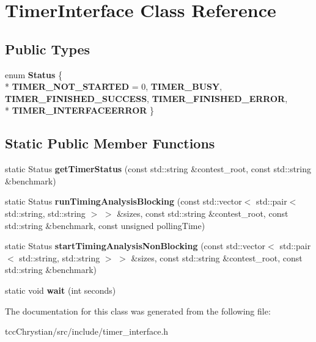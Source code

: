 \hypertarget{classTimerInterface}{\section{Timer\-Interface Class Reference}
\label{classTimerInterface}
}
\subsection*{Public Types}
\begin{DoxyCompactItemize}
\item 
enum {\bfseries Status} \{ \\*
{\bfseries T\-I\-M\-E\-R\-\_\-\-N\-O\-T\-\_\-\-S\-T\-A\-R\-T\-E\-D} = 0, 
{\bfseries T\-I\-M\-E\-R\-\_\-\-B\-U\-S\-Y}, 
{\bfseries T\-I\-M\-E\-R\-\_\-\-F\-I\-N\-I\-S\-H\-E\-D\-\_\-\-S\-U\-C\-C\-E\-S\-S}, 
{\bfseries T\-I\-M\-E\-R\-\_\-\-F\-I\-N\-I\-S\-H\-E\-D\-\_\-\-E\-R\-R\-O\-R}, 
\\*
{\bfseries T\-I\-M\-E\-R\-\_\-\-I\-N\-T\-E\-R\-F\-A\-C\-E\-E\-R\-R\-O\-R}
 \}
\end{DoxyCompactItemize}
\subsection*{Static Public Member Functions}
\begin{DoxyCompactItemize}
\item 
\hypertarget{classTimerInterface_a42077a21e0b9a07b6768e5131415bd2d}{static Status {\bfseries get\-Timer\-Status} (const std\-::string \&contest\-\_\-root, const std\-::string \&benchmark)}\label{classTimerInterface_a42077a21e0b9a07b6768e5131415bd2d}

\item 
\hypertarget{classTimerInterface_ada94a843a56747a6a7b34373a266ab92}{static Status {\bfseries run\-Timing\-Analysis\-Blocking} (const std\-::vector$<$ std\-::pair$<$ std\-::string, std\-::string $>$ $>$ \&sizes, const std\-::string \&contest\-\_\-root, const std\-::string \&benchmark, const unsigned polling\-Time)}\label{classTimerInterface_ada94a843a56747a6a7b34373a266ab92}

\item 
\hypertarget{classTimerInterface_a9a9b69817bbbd603c3d47089b0bad829}{static Status {\bfseries start\-Timing\-Analysis\-Non\-Blocking} (const std\-::vector$<$ std\-::pair$<$ std\-::string, std\-::string $>$ $>$ \&sizes, const std\-::string \&contest\-\_\-root, const std\-::string \&benchmark)}\label{classTimerInterface_a9a9b69817bbbd603c3d47089b0bad829}

\item 
\hypertarget{classTimerInterface_aa62e01d4dd296f8bf9f716ff2da7c5fc}{static void {\bfseries wait} (int seconds)}\label{classTimerInterface_aa62e01d4dd296f8bf9f716ff2da7c5fc}

\end{DoxyCompactItemize}


The documentation for this class was generated from the following file\-:\begin{DoxyCompactItemize}
\item 
tcc\-Chrystian/src/include/timer\-\_\-interface.\-h\end{DoxyCompactItemize}
